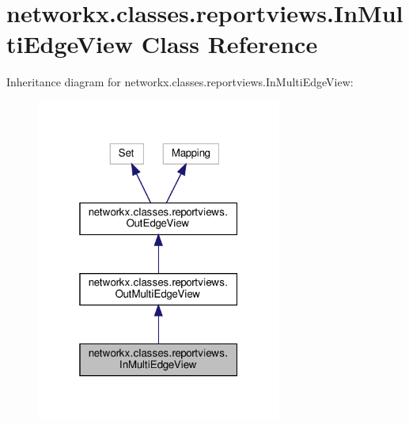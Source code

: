 \hypertarget{classnetworkx_1_1classes_1_1reportviews_1_1InMultiEdgeView}{}\section{networkx.\+classes.\+reportviews.\+In\+Multi\+Edge\+View Class Reference}
\label{classnetworkx_1_1classes_1_1reportviews_1_1InMultiEdgeView}


Inheritance diagram for networkx.\+classes.\+reportviews.\+In\+Multi\+Edge\+View\+:
\nopagebreak
\begin{figure}[H]
\begin{center}
\leavevmode
\includegraphics[width=229pt]{classnetworkx_1_1classes_1_1reportviews_1_1InMultiEdgeView__inherit__graph}
\end{center}
\end{figure}


